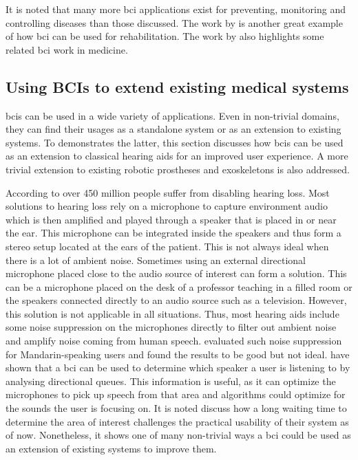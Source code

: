 It is noted that many more \gls{bci} applications exist for preventing, monitoring and controlling diseases than those discussed.
The work by \citet{parkinson_stroke_reduction} is another great example of how \gls{bci} can be used for rehabilitation.
The work by \citet{bci_in_medicine} also highlights some related \gls{bci} work in medicine.


\subsection{Using BCIs to extend existing medical systems}
\label{subsec:bci_helping_disabled_extending_medical_system}

\Glspl{bci} can be used in a wide variety of applications.
Even in non-trivial domains, they can find their usages as a standalone system or as an extension to existing systems.
To demonstrates the latter, this section discusses how \glspl{bci} can be used as an extension to classical hearing aids for an improved user experience.
A more trivial extension to existing robotic prostheses and exoskeletons is also addressed.


According to \citet{hearing_aids_noise_reduction} over 450 million people suffer from disabling hearing loss.
Most solutions to hearing loss rely on a microphone to capture environment audio which is then amplified and played through a speaker that is placed in or near the ear.
This microphone can be integrated inside the speakers and thus form a stereo setup located at the ears of the patient.
This is not always ideal when there is a lot of ambient noise.
Sometimes using an external directional microphone placed close to the audio source of interest can form a solution.
This can be a microphone placed on the desk of a professor teaching in a filled room or the speakers connected directly to an audio source such as a television.
However, this solution is not applicable in all situations.
Thus, most hearing aids include some noise suppression on the microphones directly to filter out ambient noise and amplify noise coming from human speech.
 evaluated such noise suppression for Mandarin-speaking users and found the results to be good but not ideal.
 have shown that a \gls{bci} can be used to determine which speaker a user is listening to by analysing directional queues.
This information is useful, as it can optimize the microphones to pick up speech from that area and algorithms could optimize for the sounds the user is focusing on.
It is noted \citet{bci_hearing_aid_direction} discuss how a long waiting time to determine the area of interest challenges the practical usability of their system as of now.
Nonetheless, it shows one of many non-trivial ways a \gls{bci} could be used as an extension of existing systems to improve them.

